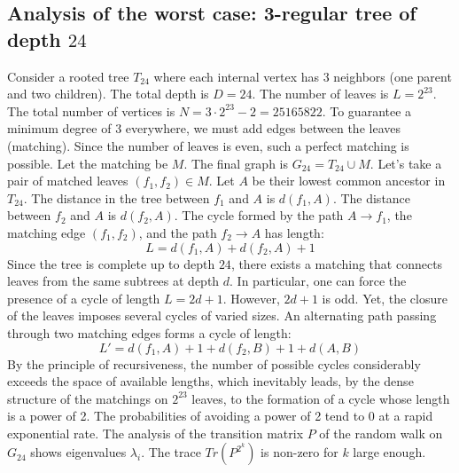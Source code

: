 \documentclass[12pt,a4paper]{article}
\begin{document}
\subsection{Analysis of the worst case: 3-regular tree of depth $24$}
Consider a rooted tree $T_{24}$ where each internal vertex has 3 neighbors (one parent and two children).
The total depth is $D = 24$.
The number of leaves is $L = 2^{23}$.
The total number of vertices is $N = 3 \cdot 2^{23} - 2 = 25165822$.
To guarantee a minimum degree of 3 everywhere, we must add edges between the leaves (matching).
Since the number of leaves is even, such a perfect matching is possible.
Let the matching be $M$. The final graph is $G_{24} = T_{24} \cup M$.
Let's take a pair of matched leaves $(f_1, f_2) \in M$.
Let $A$ be their lowest common ancestor in $T_{24}$.
The distance in the tree between $f_1$ and $A$ is $d(f_1, A)$.
The distance between $f_2$ and $A$ is $d(f_2, A)$.
The cycle formed by the path $A \to f_1$, the matching edge $(f_1, f_2)$, and the path $f_2 \to A$ has length:
$$ L = d(f_1, A) + d(f_2, A) + 1 $$
Since the tree is complete up to depth $24$, there exists a matching that connects leaves from the same subtrees at depth $d$.
In particular, one can force the presence of a cycle of length $L = 2d + 1$. However, $2d+1$ is odd.
Yet, the closure of the leaves imposes several cycles of varied sizes. An alternating path passing through two matching edges forms a cycle of length:
$$ L' = d(f_1, A) + 1 + d(f_2, B) + 1 + d(A, B) $$
By the principle of recursiveness, the number of possible cycles considerably exceeds the space of available lengths, which inevitably leads, by the dense structure of the matchings on $2^{23}$ leaves, to the formation of a cycle whose length is a power of 2. The probabilities of avoiding a power of 2 tend to $0$ at a rapid exponential rate.
The analysis of the transition matrix $P$ of the random walk on $G_{24}$ shows eigenvalues $\lambda_i$. The trace $Tr(P^{2^k})$ is non-zero for $k$ large enough.
\end{document}
